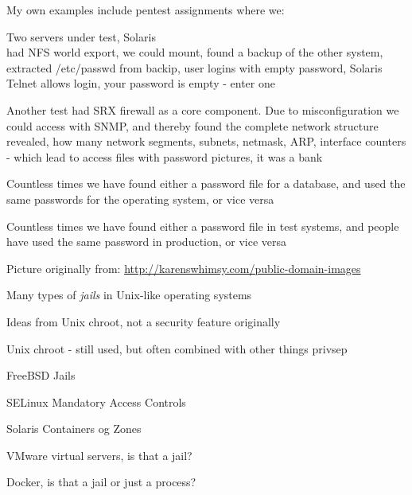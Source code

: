\documentclass[Screen16to9,17pt]{foils}
\begin{document}
\begin{list1}
\item My own examples include pentest assignments where we:
\begin{list2}
\item Two servers under test, Solaris\\
had NFS world export, we could mount, found a backup of the other system, extracted /etc/passwd from backip, user logins with empty password, Solaris Telnet allows login, your password is empty - enter one
\item Another test had SRX firewall as a core component. Due to misconfiguration we could access with SNMP, and thereby found the complete network structure revealed, how many network segments, subnets, netmask, ARP, interface counters - which lead to access files with password pictures, it was a bank
\item Countless times we have found either a password file for a database, and used the same passwords for the operating system, or vice versa
\item Countless times we have found either a password file in test systems, and people have used the same password in production, or vice versa
\end{list2}
\end{list1}



\centerline{Picture originally from: \url{http://karenswhimsy.com/public-domain-images}}



\begin{list1}
\item Many types of \emph{jails} in Unix-like operating systems
\item Ideas from Unix chroot, not a security feature originally
\begin{list2}
\item Unix chroot - still used, but often combined with other things privsep
\item FreeBSD Jails
\item SELinux Mandatory Access Controls
\item Solaris Containers og Zones
\item VMware virtual servers, is that a jail?
\item Docker, is that a jail or just a process?
\end{list2}
\end{list1}
\end{document}
